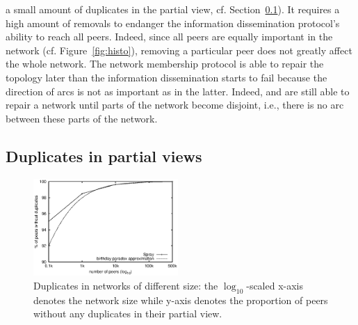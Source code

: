 \begin{asparadesc}
  a small amount of duplicates in the partial view,
  cf. Section~\ref{subsec:duplicates}). It requires a high amount of removals
  to endanger the information dissemination protocol's ability to reach all
  peers. Indeed, since all peers are equally important in the network
  (cf. Figure~\ref{fig:histo}), removing a particular peer does not greatly
  affect the whole network. The network membership protocol is able to repair
  the topology later than the information dissemination starts to fail because
  the direction of arcs is not as important as in the latter. Indeed, \CYCLON
  and \SPRAY are still able to repair a network until parts of the network
  become disjoint, i.e., there is no arc between these parts of the network.
\end{asparadesc}

\subsection{Duplicates in partial views}
\label{subsec:duplicates}

\begin{figure}
  \centering
  \includegraphics[width=0.49\textwidth]{img/duplicates.eps}
  \caption{\label{fig:duplicates}Duplicates in networks of different size: the
    $\log_{10}$-scaled x-axis denotes the network size while y-axis denotes the
    proportion of peers without any duplicates in their partial view.}
\end{figure}

